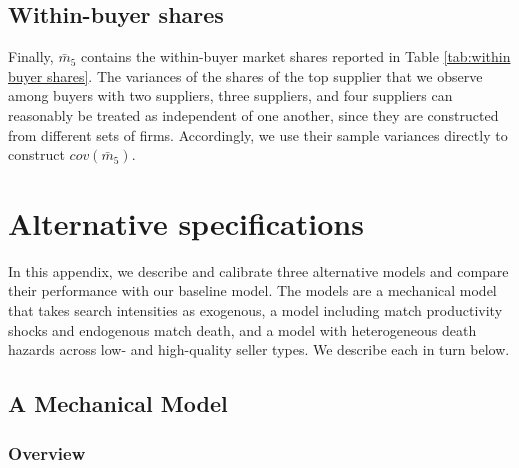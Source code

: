 \documentclass[12pt]{article} \usepackage{amsmath,amssymb,amsthm,geometry,graphicx,setspace,algorithm,algpseudocode,float}
\begin{document}
\subsection{Within-buyer shares}

Finally, $\bar{m}_{5}$ contains the within-buyer market shares reported in
Table \ref{tab:within buyer shares}. The variances of the shares of the top supplier that we observe among buyers with two suppliers, three suppliers, and four suppliers can reasonably be treated as independent of one another, since they are constructed from different sets of firms. Accordingly, we use their sample variances directly to construct $cov(\bar{m}_{5})$.

\section{Alternative specifications}
\label{sec:alternative_specifications}

In this appendix, we describe and calibrate three alternative models and compare their performance with our baseline model.  The models are a mechanical model that takes search intensities as exogenous, a model including match productivity shocks and endogenous match death, and a model with heterogeneous death hazards across low- and high-quality seller types.  We describe each in turn below.

\subsection{A Mechanical Model}
\label{sec:mechanical_model}

\subsubsection{Overview}
\end{document}
